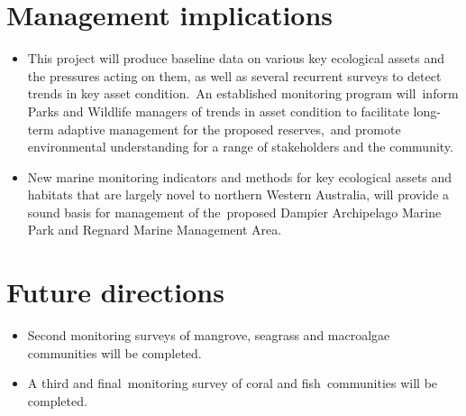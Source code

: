 \documentclass[version=last,
    paper=a4,                               %
    10pt,                                   %
    dvipsnames,
    oneside,                              %
    headings=openany,                       %
    open=any,
    BCOR=7mm,                               %
    DIV=15,     %
]{scrbook}
\begin{document}
\section*{Management implications}

\begin{itemize}
\itemsep1pt\parskip0pt
\item
  This project will produce baseline data on various key ecological
  assets and the pressures acting on them, as well as several recurrent
  surveys to detect trends in key asset condition.~An established
  monitoring program will~inform Parks and Wildlife managers of trends
  in asset condition to facilitate long-term adaptive management for the
  proposed reserves,~and promote environmental understanding for a range
  of stakeholders and the community.
\item
  New marine monitoring indicators and methods for key ecological assets
  and habitats that are largely novel to northern Western Australia,
  will provide a sound basis for management of the~proposed Dampier
  Archipelago Marine Park and Regnard Marine Management Area.
\end{itemize}




\section*{Future directions}

\begin{itemize}
\itemsep1pt\parskip0pt
\item
  Second monitoring surveys of mangrove, seagrass and macroalgae
  communities will be completed.~
\item
  A third and final~monitoring survey of coral and fish~communities will
  be completed.
\end{itemize}



\end{document}
